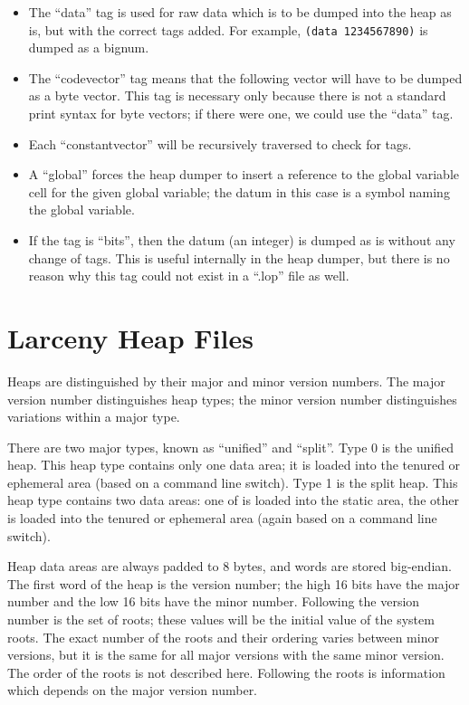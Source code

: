 \begin{itemize}
\item
The ``data'' tag is used for raw data which is to be dumped
into the heap as is, but with the correct tags added. For example,
\verb+(data 1234567890)+ is dumped as a bignum.

\item
The ``codevector'' tag means that the following vector will have to be dumped
as a byte vector. This tag is necessary only because there is not a standard
print syntax for byte vectors; if there were one, we could use the ``data''
tag.

\item
Each ``constantvector'' will be recursively traversed to check for tags.

\item
A ``global'' forces the heap dumper to insert a reference to the global
variable cell for the given global variable; the datum in this case is
a symbol naming the global variable.

\item
If the tag is ``bits'', then the datum (an integer) is dumped as is without 
any change of tags. This is useful internally in the heap dumper, but there is
no reason why this tag could not exist in a ``.lop'' file as well.

\end{itemize}

\section{Larceny Heap Files}

Heaps are distinguished by their major and minor version numbers. The major
version number distinguishes heap types; the minor version number
distinguishes variations within a major type.

There are two major types, known as ``unified'' and ``split''. Type 0 is the
unified heap. This heap type contains only one data area; it is loaded into
the tenured or ephemeral area (based on a command line switch). Type 1 is
the split heap. This heap type contains two data areas: one of is loaded
into the static area, the other is loaded into the tenured or ephemeral area
(again based on a command line switch).

Heap data areas are always padded to 8 bytes, and words are stored
big-endian.  The first word of the heap is the version number; the high 16
bits have the major number and the low 16 bits have the minor number.
Following the version number is the set of roots; these values will be the
initial value of the system roots. The exact number of the roots and their
ordering varies between minor versions, but it is the same for all major
versions with the same minor version. The order of the roots is not
described here. Following the roots is information which depends on the
major version number.

